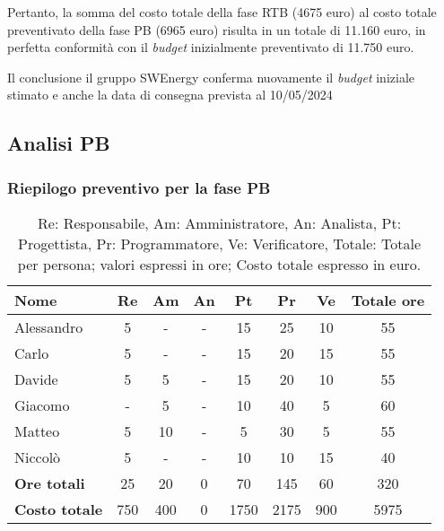 Pertanto, la somma del costo totale della fase RTB (4675 euro) al costo totale preventivato della fase PB (6965 euro) risulta in un totale di 11.160 euro,
in perfetta conformità con il \textit{budget} inizialmente preventivato di 11.750 euro.


Il conclusione il gruppo SWEnergy conferma nuovamente il \textit{budget} iniziale stimato e anche la data di consegna prevista al 10/05/2024



\subsection{Analisi PB}
\subsubsection{Riepilogo preventivo per la fase PB}
\begin{table}[H]
	\centering
	\begin{tabular}{l|c|c|c|c|c|c|c}
		\textbf{Nome}         & \textbf{Re} & \textbf{Am} & \textbf{An} & \textbf{Pt} & \textbf{Pr} & \textbf{Ve} & \textbf{Totale ore} \\
		\hline
		Alessandro            & 5           & -           & -           & 15          & 25          & 10          & 55                  \\
		Carlo                 & 5           & -           & -           & 15          & 20          & 15          & 55                  \\
		Davide                & 5           & 5           & -           & 15          & 20          & 10          & 55                  \\
		Giacomo               & -           & 5           & -           & 10          & 40          & 5           & 60                  \\
		Matteo                & 5           & 10          & -           & 5           & 30          & 5           & 55                  \\
		Niccolò               & 5           & -           & -           & 10          & 10          & 15          & 40                  \\
		\hline
		\textbf{Ore totali}   & 25          & 20          & 0           & 70          & 145         & 60          & 320                 \\
		\textbf{Costo totale} & 750         & 400         & 0           & 1750        & 2175        & 900         & 5975
	\end{tabular}
	\caption{Re: Responsabile, Am: Amministratore, An: Analista, Pt: Progettista, Pr: Programmatore, Ve: Verificatore, Totale: Totale per persona; valori espressi in ore; Costo totale espresso in euro.}
\end{table}



